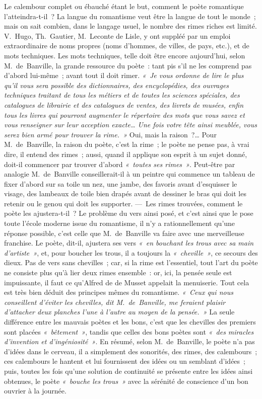 \documentclass[french,twoside]{book} %
\begin{document}
Le calembour complet ou ébauché étant le but, comment le poète romantique l’atteindra-t-il ? La langue du romantisme veut être la langue de tout le monde ; mais on sait combien, dans le langage usuel, le nombre des rimes riches est limité. V. Hugo, Th. Gautier, M. Leconte de Lisle, y ont suppléé par un emploi extraordinaire de noms propres (noms d’hommes, de villes, de pays, etc.), et de mots techniques. Les mots techniques, telle doit être encore aujourd’hui, selon M. de Banville, la grande ressource du poète : tant pis s’il ne les comprend pas d’abord lui-même ; avant tout il doit rimer. \emph{« Je vous ordonne de lire le plus qu’il vous sera possible des dictionnaires, des encyclopédies, des ouvrages techniques traitant de tous les métiers et de toutes les sciences spéciales, des catalogues de librairie et des catalogues de ventes, des livrets de musées, enfin tous les livres qui pourront augmenter le répertoire des mots que vous savez et vous renseigner sur leur acception exacte… Une fois votre tête ainsi meublée, vous serez bien armé pour trouver la rime. »} Oui, mais la raison ?… Pour M. de Banville, la raison du poète, c’est la rime ; le poète ne pense pas, à vrai dire, il entend des rimes ; aussi, quand il applique son esprit à un sujet donné, doit-il commencer par trouver d’abord \emph{« toutes ses rimes »}. Peut-être par  analogie M. de Banville conseillerait-il à un peintre qui commence un tableau de fixer d’abord sur sa toile un nez, une jambe, des favoris avant d’esquisser le visage, des lambeaux de toile bien drapés avant de dessiner le bras qui doit les retenir ou le genou qui doit les supporter. — Les rimes trouvées, comment le poète les ajustera-t-il ? Le problème du vers ainsi posé, et c’est ainsi que le pose toute l’école moderne issue du romantisme, il n’y a rationnellement qu’une réponse possible, c’est celle que M. de Banville va faire avec une merveilleuse franchise. Le poète, dit-il, ajustera ses vers \emph{« en bouchant les trous avec sa main d’artiste »}, et, pour boucher les trous, il a toujours la \emph{« cheville »}, ce secours des dieux. Pas de vers sans chevilles ; car, si la rime est l’essentiel, tout l’art du poète ne consiste plus qu’à lier deux rimes ensemble : or, ici, la pensée seule est impuissante, il faut ce qu’Alfred de de Musset appelait la menuiserie. Tout cela est très bien déduit des principes mêmes du romantisme. \emph{« Ceux qui nous conseillent d’éviter les chevilles, dit M. de Banville, me feraient plaisir d’attacher deux planches l’une à l’autre au moyen de la pensée. »} La seule différence entre les mauvais poètes et les bons, c’est que les chevilles des premiers sont placées \emph{« bêtement »}, tandis que celles des bons poètes sont \emph{« des miracles d’invention et d’ingéniosité »}. En résumé, selon M. de Banville, le poète n’a pas d’idées dans le cerveau, il a simplement des sonorités, des rimes, des calembours ; ces calembours le hantent et lui fournissent des idées ou un semblant d’idées ; puis, toutes les fois qu’une solution de continuité se présente entre les  idées ainsi obtenues, le poète \emph{« bouche les trous »} avec la sérénité de conscience d’un bon ouvrier à la journée.\par
\end{document}
